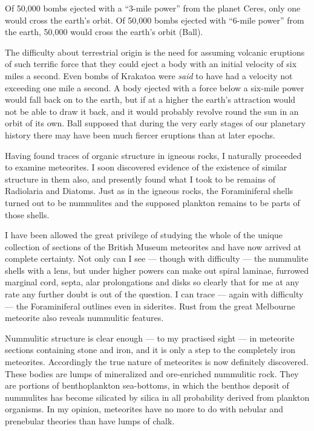 \documentclass[a4paper, 12pt, oneside]{article}
\begin{document}
Of 50,000 bombs ejected with a ``3-mile power'' from the planet Ceres, only one would cross the earth's orbit. Of 50,000 bombs ejected with ``6-mile power'' from the earth, 50,000 would cross the earth's orbit (Ball).

The difficulty about terrestrial origin is the need for assuming volcanic eruptions of such terrific force that they could eject a body with an initial velocity of six miles a second. Even bombs of Krakatoa were \emph{said} to have had a velocity not exceeding one mile a second. A body ejected with a force below a six-mile power would fall back on to the earth, but if at a higher the earth's attraction would not be able to draw it back, and it would probably revolve round the sun in an orbit of its own. Ball supposed that during the very early stages of our planetary history there may have been much fiercer eruptions than at later epochs.

Having found traces of organic structure in igneous rocks, I naturally proceeded to examine meteorites. I soon discovered evidence of the existence of similar structure in them also, and presently found what I took to be remains of Radiolaria and Diatoms. Just as in the igneous rocks, the Foraminiferal shells turned out to be nummulites and the supposed plankton remains to be parts of those shells.

I have been allowed the great privilege of studying the whole of the unique collection of sections of the British Museum meteorites and have now arrived at complete certainty. Not only can I see --- though with difficulty --- the nummulite shells with a lens, but under higher powers can make out spiral laminae, furrowed marginal cord, septa, alar prolongations and disks so clearly that for me at any rate any further doubt is out of the question. I can trace --- again with difficulty --- the Foraminiferal outlines even in siderites. Rust from the great Melbourne meteorite also reveals nummulitic features.

Nummulitic structure is clear enough --- to my practised sight --- in meteorite sections containing stone and iron, and it is only a step to the completely iron meteorites. Accordingly the true nature of meteorites is now definitely discovered. These bodies are lumps of mineralized and ore-enriched nummulitic rock. They are portions of benthoplankton sea-bottoms, in which the benthos deposit of nummulites has become silicated by silica in all probability derived from plankton organisms. In my opinion, meteorites have no more to do with nebular and prenebular theories than have lumps of chalk.
\end{document}
